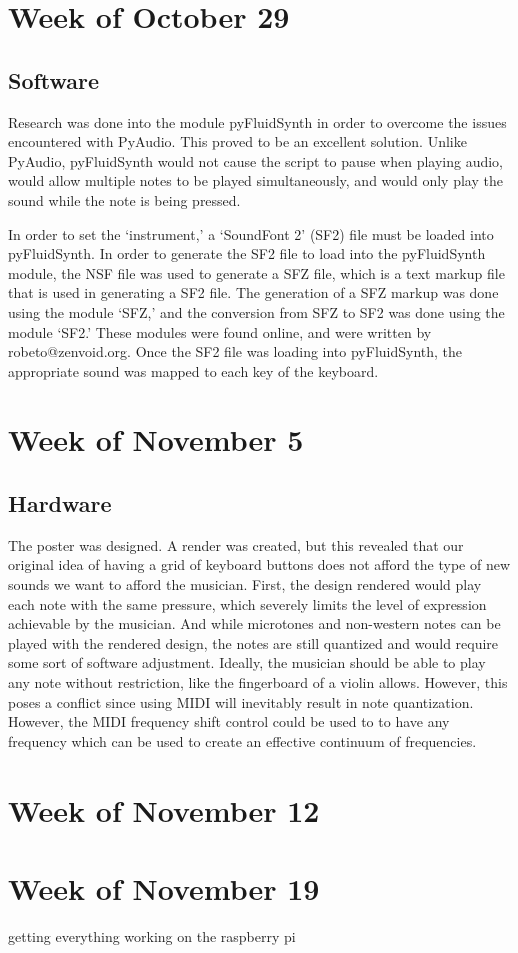 \documentclass{article}
\begin{document}
\section{Week of October 29}

\subsection{Software}

Research was done into the module pyFluidSynth in order to overcome the issues encountered with PyAudio. This proved to be an excellent solution. Unlike PyAudio, pyFluidSynth would not cause the script to pause when playing audio, would allow multiple notes to be played simultaneously, and would only play the sound while the note is being pressed.

In order to set the `instrument,' a `SoundFont 2' (SF2) file must be loaded into pyFluidSynth. In order to generate the SF2 file to load into the pyFluidSynth module, the NSF file was used to generate a SFZ file, which is a text markup file that is used in generating a SF2 file. The generation of a SFZ markup was done using the module `SFZ,' and the conversion from SFZ to SF2 was done using the module `SF2.' These modules were found online, and were written by robeto@zenvoid.org. Once the SF2 file was loading into pyFluidSynth, the appropriate sound was mapped to each key of the keyboard.



\section{Week of November 5}

\subsection{Hardware}
The poster was designed. A render was created, but this revealed that our original idea of having a grid of keyboard buttons does not afford the type of new sounds we want to afford the musician. First, the design rendered would play each note with the same pressure, which severely limits the level of expression achievable by the musician. And while microtones and non-western notes can be played with the rendered design, the notes are still quantized and would require some sort of software adjustment. Ideally, the musician should be able to play any note without restriction, like the fingerboard of a violin allows. However, this poses a conflict since using MIDI will inevitably result in note quantization. However, the MIDI frequency shift control could be used to to have any frequency which can be used to create an effective continuum of frequencies.


\section{Week of November 12}

\section{Week of November 19}

getting everything working on the raspberry pi
\end{document}
